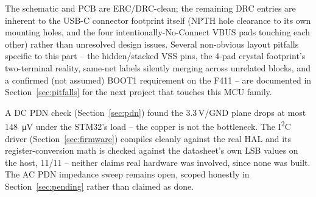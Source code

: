 \documentclass[11pt]{article}
\begin{document}
The schematic and PCB are ERC/DRC-clean; the remaining DRC entries are inherent to the USB-C
connector footprint itself (NPTH hole clearance to its own mounting holes, and the four
intentionally-No-Connect VBUS pads touching each other) rather than unresolved design issues. Several
non-obvious layout pitfalls specific to this part -- the hidden/stacked VSS pins, the 4-pad crystal
footprint's two-terminal reality, same-net labels silently merging across unrelated blocks, and a
confirmed (not assumed) BOOT1 requirement on the F411 -- are documented in
Section~\ref{sec:pitfalls} for the next project that touches this MCU family.

A DC PDN check (Section~\ref{sec:pdn}) found the 3.3\,V/GND plane drops at most
\SI{148}{\micro\volt} under the STM32's load -- the copper is not the bottleneck. The I\textsuperscript{2}C
driver (Section~\ref{sec:firmware}) compiles cleanly against the real HAL and its register-conversion
math is checked against the datasheet's own LSB values on the host, 11/11 -- neither claims real
hardware was involved, since none was built. The AC PDN impedance sweep remains open, scoped honestly
in Section~\ref{sec:pending} rather than claimed as done.
\end{document}
